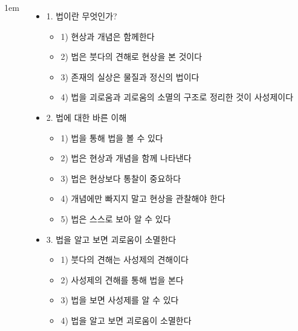 \documentclass[	14pt, 
							a1paper, 
							portrait, %
							margin=0mm, %
							innermargin=10mm,  		%
							colspace=5mm, 
							subcolspace=0mm
							]{tikzposter}
\begin{document}
\begin{columns}
{\begin{itemize}
					\end{itemize}
			}


			{
					\setlength{\leftmargini}{2em}
					\setlength{\labelsep} {1em}
					\begin{itemize}
					\item 1. 법이란 무엇인가?
						\begin{itemize}
						\item 1) 현상과 개념은 함께한다
						\item 2) 법은 붓다의 견해로 현상을 본 것이다
						\item 3) 존재의 실상은 물질과 정신의 법이다
						\item 4) 법을 괴로움과 괴로움의 소멸의 구조로 정리한 것이 사성제이다
						\end{itemize}

					\item 2. 법에 대한 바른 이해
						\begin{itemize}
						\item 1) 법을 통해 법을 볼 수 있다
						\item 2) 법은 현상과 개념을 함께 나타낸다
						\item 3) 법은 현상보다 통찰이 중요하다
						\item 4) 개념에만 빠지지 말고 현상을 관찰해야 한다
						\item 5) 법은 스스로 보아 알 수 있다
						\end{itemize}
	
					\item 3. 법을 알고 보면 괴로움이 소멸한다
						\begin{itemize}
						\item 1) 붓다의 견해는 사성제의 견해이다
						\item 2) 사성제의 견해를 통해 법을 본다
						\item 3) 법을 보면 사성제를 알 수 있다
						\item 4) 법을 알고 보면 괴로움이 소멸한다
						\end{itemize}
					\end{itemize}

			}




\end{columns}
\end{document}
